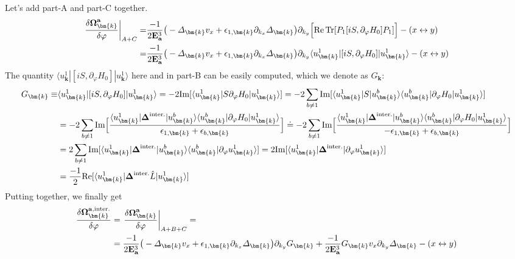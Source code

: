\begin{subappendices}
Let's add part-A and part-C together. 
\begin{align}
	\left.\frac{\delta\boldsymbol\Omega^{\mathbf a}_{\bm{k}}}{\delta\varphi}\right|_{A+C}=&\frac{-1}{2\mathbf E_{\mathbf a}^3}\big(-\varDelta_{\bm{k}} v_x+\epsilon_{1,\bm{k}}\partial_{k_x}\varDelta_{\bm{k}}\big)\partial_{k_y}\Big[\mbox{Re\,Tr}[P_1[iS,\partial_\varphi H_0]P_1]\Big]-(x\leftrightarrow y)\notag\\
	=&\frac{-1}{2\mathbf E_{\mathbf a}^3}\big(-\varDelta_{\bm{k}} v_x+\epsilon_{1,\bm{k}}\partial_{k_x}\varDelta_{\bm{k}}\big)\partial_{k_y}\langle u^1_{\bm{k}}|[iS,\partial_\varphi H_0]|u^1_{\bm{k}}\rangle-(x\leftrightarrow y)
\end{align}
The quantity $\langle u^1_{\bm{k}}|[iS,\partial_\varphi H_0]|u^1_{\bm{k}}\rangle$ here and in part-B can be easily computed, which we denote as $G_{\bm{k}}$:
\begin{align}
	G_{\bm{k}}\equiv&\langle u^1_{\bm{k}}|[iS,\partial_\varphi H_0]|u^1_{\bm{k}}\rangle=-2\mbox{Im}[\langle u^1_{\bm{k}}| S \partial_\varphi H_0|u^1_{\bm{k}}\rangle]=-2\sum_{b\neq 1}\mbox{Im}[\langle u^1_{\bm{k}}| S |u^b_{\bm{k}}\rangle\langle u^b_{\bm{k}}|\partial_\varphi H_0|u^1_{\bm{k}}\rangle]\notag\\
	&=-2\sum_{b\neq 1}\mbox{Im}\Big[\frac{\langle u^1_{\bm{k}}| \boldsymbol\Delta^{\text{inter.}} |u^b_{\bm{k}}\rangle\langle u^b_{\bm{k}}|\partial_\varphi H_0|u^1_{\bm{k}}\rangle}{\epsilon_{1,\bm{k}}+\epsilon_{b,\bm{k}}}\Big]\doteq-2\sum_{b\neq 1}\mbox{Im}\Big[\frac{\langle u^1_{\bm{k}}| \boldsymbol\Delta^{\text{inter.}} |u^b_{\bm{k}}\rangle\langle u^b_{\bm{k}}|\partial_\varphi H_0|u^1_{\bm{k}}\rangle}{-\epsilon_{1,\bm{k}}+\epsilon_{b,\bm{k}}}\Big]\notag\\
	&=2\sum_{b\neq 1}\mbox{Im}[\langle u^1_{\bm{k}}| \boldsymbol\Delta^{\text{inter.}} |u^b_{\bm{k}}\rangle\langle u^b_{\bm{k}} |\partial_\varphi u^1_{\bm{k}}\rangle]=2\mbox{Im}[\langle u^1_{\bm{k}}| \boldsymbol\Delta^{\text{inter.}} |\partial_\varphi u^1_{\bm{k}}\rangle]\notag\\
    &=\frac{-1}{2}\mbox{Re}[\langle u^1_{\bm{k}}| \boldsymbol\Delta^{\text{inter.}}\hat L | u^1_{\bm{k}}\rangle]
\end{align}
Putting together, we finally get
\begin{align}
	\frac{\delta\boldsymbol\Omega^{\mathbf a,\text{inter.}}_{\bm{k}}}{\delta\varphi} &= \left.\frac{\delta\boldsymbol\Omega^{\mathbf a}_{\bm{k}}}{\delta\varphi}\right|_{A+B+C}=\notag\\
    &=\frac{-1}{2\mathbf E_{\mathbf a}^3}\big(-\varDelta_{\bm{k}} v_x+\epsilon_{1,\bm{k}}\partial_{k_x}\varDelta_{\bm{k}}\big)\partial_{k_y}G_{\bm{k}}+\frac{-1}{2\mathbf E_{\mathbf a}^3}G_{\bm{k}} v_x\partial_{k_y}\varDelta_{\bm{k}}-(x\leftrightarrow y)
\end{align}


\end{subappendices}
